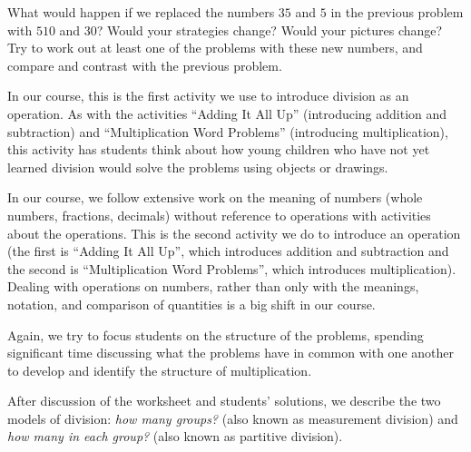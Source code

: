 \documentclass[nooutcomes]{ximera}
\begin{document}
\begin{problem}
What would happen if we replaced the numbers $35$ and $5$ in the previous problem with $510$ and $30$?  Would your strategies change?  Would your pictures change?  Try to work out at least one of the problems with these new numbers, and compare and contrast with the previous problem.
\end{problem}

\newpage

\begin{instructorNotes}
In our course, this is the first activity we use to introduce division as an operation.  As with the activities ``Adding It All Up'' (introducing addition and subtraction) and ``Multiplication Word Problems'' (introducing multiplication), this activity has students think about how young children who have not yet learned division would solve the problems using objects or drawings.

In our course, we follow extensive work on the meaning of numbers (whole numbers, fractions, decimals) without reference to operations with activities about the operations.  This is the second activity we do to introduce an operation (the first is ``Adding It All Up'', which introduces addition and subtraction and the second is ``Multiplication Word Problems'', which introduces multiplication). Dealing with operations on numbers, rather than only with the meanings, notation, and comparison of quantities is a big shift in our course.

Again, we try to focus students on the structure of the problems, spending significant time discussing what the problems have in common with one another to develop and identify the structure of multiplication.

After discussion of the worksheet and students' solutions, we describe the two models of division: {\em how many groups?} (also known as measurement division) and {\em how many in each group? } (also known as partitive division).


\end{instructorNotes}
\end{document}
